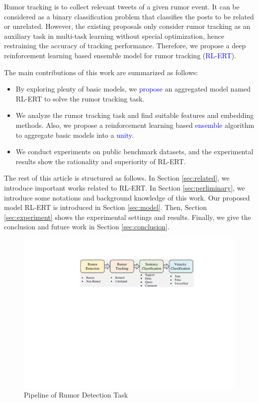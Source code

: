 \documentclass[review]{elsarticle}
\begin{document}
Rumor tracking is to collect relevant tweets of a given rumor event. It can be considered as a binary classification problem that classifies the posts to be related or unrelated. However, the existing proposals \cite{DBLP:conf/emnlp/QazvinianRRM11, DBLP:conf/www/ChengNB20}  only consider rumor tracking as an auxiliary task in multi-task learning without special optimization, hence restraining the accuracy of tracking performance.
Therefore, we propose a deep reinforcement learning based ensemble model for rumor tracking (\textcolor{blue}{RL-ERT}).

The main contributions of this work are summarized as follows:
\begin{itemize}
	\item By exploring plenty of basic models, we \textcolor{blue}{propose} an aggregated model named RL-ERT to solve the rumor tracking task. 
	\item We analyze the rumor tracking task and find suitable features and embedding methods. Also, we propose a reinforcement learning based \textcolor{blue}{ensemble} algorithm to aggregate basic models into a \textcolor{blue}{unity}.
	\item We conduct experiments on public benchmark datasets, and the experimental results show the rationality and superiority of RL-ERT.
\end{itemize}

The rest of this article is structured as follows. In Section \ref{sec:related}, we introduce important works related to RL-ERT. In Section \ref{sec:perliminary}, we introduce some notations and background knowledge of this work. Our proposed model RL-ERT is introduced in Section \ref{sec:model}. Then, Section \ref{sec:experiment} shows the experimental settings and results. Finally, we give the conclusion and future work in Section \ref{sec:conclusion}.

\begin{figure}[tbp]
	\hspace{0ex}
	\vspace{0ex}
	\centering
	\includegraphics[width = \textwidth]{pipeline}
	\caption{Pipeline of Rumor Detection Task}
	\label{fig:pipeline}
\end{figure}
\end{document}
